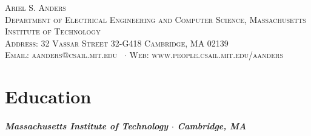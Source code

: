 \documentclass[10pt,letterpaper]{article}
\newcommand{\namestyle}{\Huge \scshape}
\newcommand{\deptstyle}{\footnotesize \rmfamily \scshape}
\newcommand{\addressstyle}{\footnotesize \rmfamily \upshape}
\begin{document}
\pagebreak
\fi
\begin{center}
\namestyle Ariel S. Anders \\[0.3em]
\deptstyle Department of Electrical Engineering and Computer Science, Massachusetts Institute of Technology \\[0.2em]
\addressstyle Address: 32 Vassar Street 32-G418 Cambridge, MA 02139\\
Email: aanders@csail.mit.edu \ $\cdot$ Web: www.people.csail.mit.edu/aanders
\end{center}

\section*{Education}
 \subparagraph{Massachusetts Institute of Technology $\cdot$ Cambridge, MA}
\end{document}
